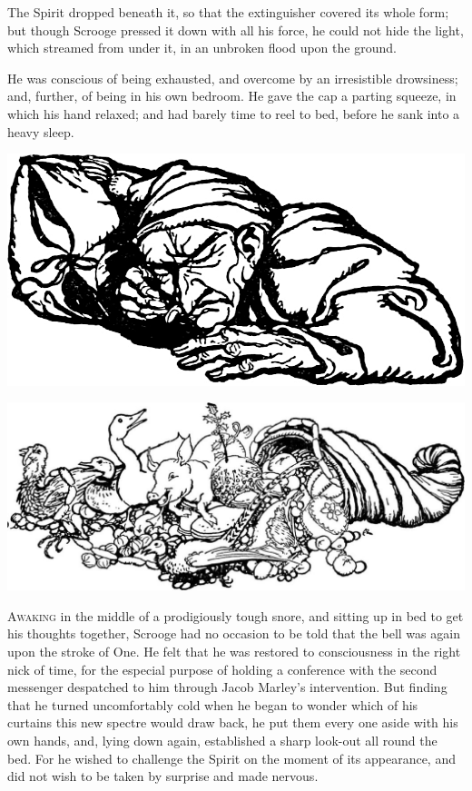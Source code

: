\documentclass[paper=5.5in:8.5in,BCOR=7mm,twoside,DIV=calc,12pt,usegeometry]{scrbook} %
\begin{document}
The Spirit dropped beneath it, so that the extinguisher covered its whole form; but though Scrooge pressed it down with all his force, he could not hide the light, which streamed from under it, in an unbroken flood upon the ground.

He was conscious of being exhausted, and overcome by an irresistible drowsiness; and, further, of being in his own bedroom. He gave the cap a parting squeeze, in which his hand relaxed; and had barely time to reel to bed, before he sank into a heavy sleep.
\vfill

\begin{minipage}[c]{\linewidth}
\includegraphics[width=.8\linewidth]{scroogesleep}
\end{minipage}


\begin{minipage}[c]{\linewidth}
\includegraphics[width=\linewidth]{cornucopia}
\end{minipage}
\vfill

\lettrine[loversize=.85]{A}{waking} in the middle of a prodigiously tough snore, and sitting up in bed to get his thoughts together, \newline Scrooge had no occasion to be told that the bell was again upon the stroke of One. He felt that he was restored to consciousness in the right nick of time, for the especial purpose of holding a conference with the second messenger despatched to him through Jacob Marley's intervention. But finding that he turned uncomfortably cold when he began to wonder which of his curtains this new spectre would draw back, he put them every one aside with his own hands, and, lying down again, established a sharp look-out all round the bed. For he wished to challenge the Spirit on the moment of its appearance, and did not wish to be taken by surprise and made nervous.
\end{document}
